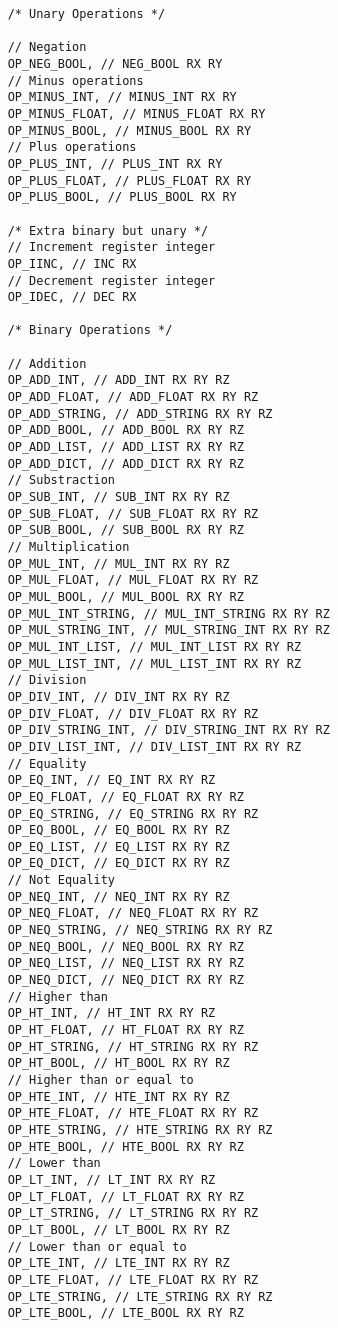 \begin{code}
\begin{verbatim}
    /* Unary Operations */

    // Negation
    OP_NEG_BOOL, // NEG_BOOL RX RY
    // Minus operations
    OP_MINUS_INT, // MINUS_INT RX RY
    OP_MINUS_FLOAT, // MINUS_FLOAT RX RY
    OP_MINUS_BOOL, // MINUS_BOOL RX RY
    // Plus operations
    OP_PLUS_INT, // PLUS_INT RX RY
    OP_PLUS_FLOAT, // PLUS_FLOAT RX RY
    OP_PLUS_BOOL, // PLUS_BOOL RX RY

    /* Extra binary but unary */
    // Increment register integer
    OP_IINC, // INC RX
    // Decrement register integer
    OP_IDEC, // DEC RX

    /* Binary Operations */

    // Addition
    OP_ADD_INT, // ADD_INT RX RY RZ
    OP_ADD_FLOAT, // ADD_FLOAT RX RY RZ
    OP_ADD_STRING, // ADD_STRING RX RY RZ
    OP_ADD_BOOL, // ADD_BOOL RX RY RZ
    OP_ADD_LIST, // ADD_LIST RX RY RZ
    OP_ADD_DICT, // ADD_DICT RX RY RZ
    // Substraction
    OP_SUB_INT, // SUB_INT RX RY RZ
    OP_SUB_FLOAT, // SUB_FLOAT RX RY RZ
    OP_SUB_BOOL, // SUB_BOOL RX RY RZ
    // Multiplication
    OP_MUL_INT, // MUL_INT RX RY RZ
    OP_MUL_FLOAT, // MUL_FLOAT RX RY RZ
    OP_MUL_BOOL, // MUL_BOOL RX RY RZ
    OP_MUL_INT_STRING, // MUL_INT_STRING RX RY RZ
    OP_MUL_STRING_INT, // MUL_STRING_INT RX RY RZ
    OP_MUL_INT_LIST, // MUL_INT_LIST RX RY RZ
    OP_MUL_LIST_INT, // MUL_LIST_INT RX RY RZ
    // Division
    OP_DIV_INT, // DIV_INT RX RY RZ
    OP_DIV_FLOAT, // DIV_FLOAT RX RY RZ
    OP_DIV_STRING_INT, // DIV_STRING_INT RX RY RZ
    OP_DIV_LIST_INT, // DIV_LIST_INT RX RY RZ
    // Equality
    OP_EQ_INT, // EQ_INT RX RY RZ
    OP_EQ_FLOAT, // EQ_FLOAT RX RY RZ
    OP_EQ_STRING, // EQ_STRING RX RY RZ
    OP_EQ_BOOL, // EQ_BOOL RX RY RZ
    OP_EQ_LIST, // EQ_LIST RX RY RZ
    OP_EQ_DICT, // EQ_DICT RX RY RZ
    // Not Equality
    OP_NEQ_INT, // NEQ_INT RX RY RZ
    OP_NEQ_FLOAT, // NEQ_FLOAT RX RY RZ
    OP_NEQ_STRING, // NEQ_STRING RX RY RZ
    OP_NEQ_BOOL, // NEQ_BOOL RX RY RZ
    OP_NEQ_LIST, // NEQ_LIST RX RY RZ
    OP_NEQ_DICT, // NEQ_DICT RX RY RZ
    // Higher than
    OP_HT_INT, // HT_INT RX RY RZ
    OP_HT_FLOAT, // HT_FLOAT RX RY RZ
    OP_HT_STRING, // HT_STRING RX RY RZ
    OP_HT_BOOL, // HT_BOOL RX RY RZ
    // Higher than or equal to
    OP_HTE_INT, // HTE_INT RX RY RZ
    OP_HTE_FLOAT, // HTE_FLOAT RX RY RZ
    OP_HTE_STRING, // HTE_STRING RX RY RZ
    OP_HTE_BOOL, // HTE_BOOL RX RY RZ
    // Lower than
    OP_LT_INT, // LT_INT RX RY RZ
    OP_LT_FLOAT, // LT_FLOAT RX RY RZ
    OP_LT_STRING, // LT_STRING RX RY RZ
    OP_LT_BOOL, // LT_BOOL RX RY RZ
    // Lower than or equal to
    OP_LTE_INT, // LTE_INT RX RY RZ
    OP_LTE_FLOAT, // LTE_FLOAT RX RY RZ
    OP_LTE_STRING, // LTE_STRING RX RY RZ
    OP_LTE_BOOL, // LTE_BOOL RX RY RZ


\end{verbatim}
\end{code}
